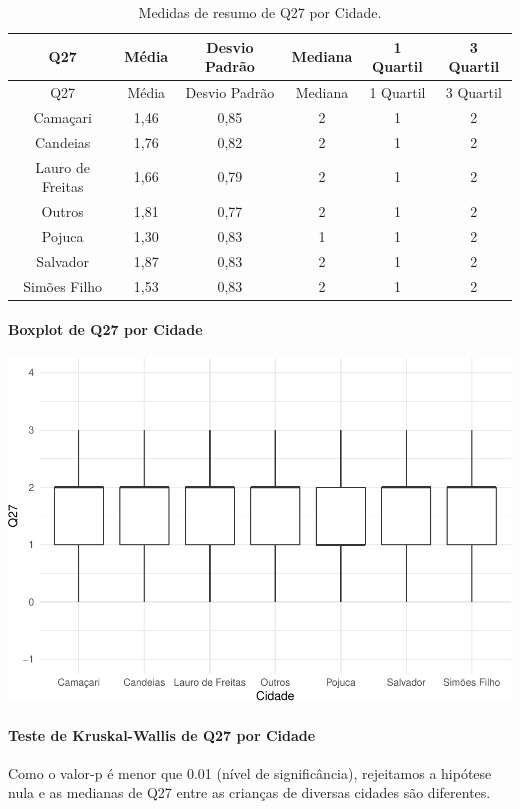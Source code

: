 \documentclass[]{article}
\let\oldparagraph\paragraph
\renewcommand{\paragraph}[1]{\oldparagraph{#1}\mbox{}}
\begin{document}
\begin{longtable}[]{@{}cccccc@{}}
\caption{\label{tab:unnamed-chunk-783}Medidas de resumo de Q27 por Cidade.}\tabularnewline
\toprule
Q27 & Média & Desvio Padrão & Mediana & 1 Quartil & 3 Quartil\tabularnewline
\midrule
\endfirsthead
\toprule
Q27 & Média & Desvio Padrão & Mediana & 1 Quartil & 3 Quartil\tabularnewline
\midrule
\endhead
Camaçari & 1,46 & 0,85 & 2 & 1 & 2\tabularnewline
Candeias & 1,76 & 0,82 & 2 & 1 & 2\tabularnewline
Lauro de Freitas & 1,66 & 0,79 & 2 & 1 & 2\tabularnewline
Outros & 1,81 & 0,77 & 2 & 1 & 2\tabularnewline
Pojuca & 1,30 & 0,83 & 1 & 1 & 2\tabularnewline
Salvador & 1,87 & 0,83 & 2 & 1 & 2\tabularnewline
Simões Filho & 1,53 & 0,83 & 2 & 1 & 2\tabularnewline
\bottomrule
\end{longtable}

\hypertarget{boxplot-de-q27-por-cidade}{%
\paragraph{Boxplot de Q27 por Cidade}\label{boxplot-de-q27-por-cidade}}

\begin{center}\includegraphics[width=0.75\linewidth]{relatorio_covid19_files/figure-latex/unnamed-chunk-784-1} \end{center}

\hypertarget{teste-de-kruskal-wallis-de-q27-por-cidade}{%
\paragraph{Teste de Kruskal-Wallis de Q27 por Cidade}\label{teste-de-kruskal-wallis-de-q27-por-cidade}}

Como o valor-p é menor que 0.01 (nível de significância), rejeitamos a hipótese nula e as medianas de Q27 entre as crianças de diversas cidades são diferentes.
\end{document}
